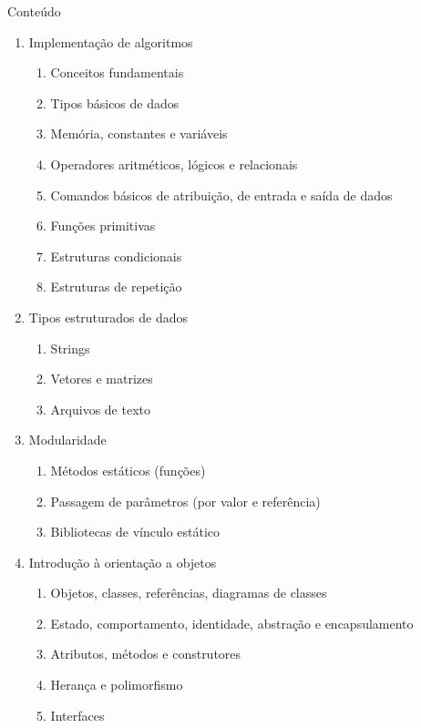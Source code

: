 \documentclass{beamer}
\begin{document}
\begin{frame}[allowframebreaks]{Conteúdo}
    \begin{enumerate}
        \item Implementação de algoritmos
        \begin{enumerate}
            \item Conceitos fundamentais
            \item Tipos básicos de dados
            \item Memória, constantes e variáveis
            \item Operadores aritméticos, lógicos e relacionais
            \item Comandos básicos de atribuição, de entrada e saída de dados
            \item Funções primitivas
            \item Estruturas condicionais
            \item Estruturas de repetição
        \end{enumerate}
        \framebreak
        \item Tipos estruturados de dados
        \begin{enumerate}
            \item Strings
            \item Vetores e matrizes
            \item Arquivos de texto
        \end{enumerate}
        \item Modularidade
        \begin{enumerate}
            \item Métodos estáticos (funções)
            \item Passagem de parâmetros (por valor e referência)
            \item Bibliotecas de vínculo estático
        \end{enumerate}
        \framebreak
        \item Introdução à orientação a objetos
        \begin{enumerate}
            \item Objetos, classes, referências, diagramas de classes
            \item Estado, comportamento, identidade, abstração e encapsulamento
            \item Atributos, métodos e construtores
            \item Herança e polimorfismo
            \item Interfaces

\end{enumerate}
\end{enumerate}
\end{frame}
\end{document}
